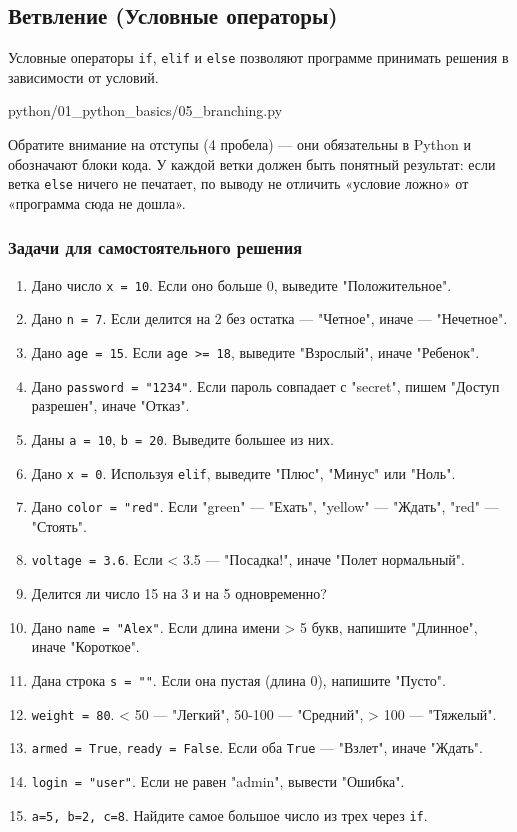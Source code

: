 \subsection{Ветвление (Условные операторы)}

Условные операторы \texttt{if}, \texttt{elif} и \texttt{else} позволяют программе принимать решения в зависимости от условий.

\begin{codefile}[python]{python/01_python_basics/05_branching.py}
\end{codefile}

Обратите внимание на отступы (4 пробела) — они обязательны в Python и обозначают блоки кода. У каждой ветки должен быть понятный результат: если ветка \texttt{else} ничего не печатает, по выводу не отличить «условие ложно» от «программа сюда не дошла».

\subsubsection*{Задачи для самостоятельного решения}

\begin{enumerate}
    \item Дано число \texttt{x = 10}. Если оно больше 0, выведите "Положительное".
    \item Дано \texttt{n = 7}. Если делится на 2 без остатка — "Четное", иначе — "Нечетное".
    \item Дано \texttt{age = 15}. Если \texttt{age >= 18}, выведите "Взрослый", иначе "Ребенок".
    \item Дано \texttt{password = "1234"}. Если пароль совпадает с "secret", пишем "Доступ разрешен", иначе "Отказ".
    \item Даны \texttt{a = 10}, \texttt{b = 20}. Выведите большее из них.
    \item Дано \texttt{x = 0}. Используя \texttt{elif}, выведите "Плюс", "Минус" или "Ноль".
    \item Дано \texttt{color = "red"}. Если "green" — "Ехать", "yellow" — "Ждать", "red" — "Стоять".
    \item \texttt{voltage = 3.6}. Если < 3.5 — "Посадка!", иначе "Полет нормальный".
    \item Делится ли число 15 на 3 и на 5 одновременно?
    \item Дано \texttt{name = "Alex"}. Если длина имени > 5 букв, напишите "Длинное", иначе "Короткое".
    \item Дана строка \texttt{s = ""}. Если она пустая (длина 0), напишите "Пусто".
    \item \texttt{weight = 80}. < 50 — "Легкий", 50-100 — "Средний", > 100 — "Тяжелый".
    \item \texttt{armed = True}, \texttt{ready = False}. Если оба \texttt{True} — "Взлет", иначе "Ждать".
    \item \texttt{login = "user"}. Если не равен "admin", вывести "Ошибка".
    \item \texttt{a=5, b=2, c=8}. Найдите самое большое число из трех через \texttt{if}.
\end{enumerate}

